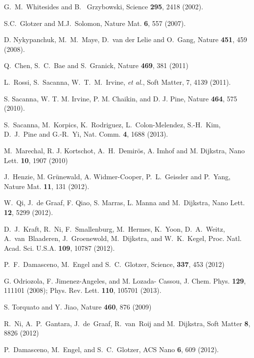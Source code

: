 \documentclass[8.5pt,oneside,onecolumn]{article}
\begin{document}
\footnotesize{
\begin{thebibliography}{99}

G.~M.~Whitesides and B.~ Grzybowski, Science {\bf295}, 2418 (2002).

S.C.~Glotzer and M.J.~Solomon, Nature Mat. {\bf 6}, 557 (2007).

D. Nykypanchuk, M.~M.~Maye, D.~van der Lelie and O.~Gang, Nature {\bf 451}, 459 (2008).

Q.~Chen, S.~C.~Bae and S.~Granick, Nature {\bf469}, 381 (2011)

L.~Rossi, S.~Sacanna, W.~T.~M.~Irvine, \emph{et al.}, Soft Matter, 7, 4139 (2011).

S. Sacanna, W. T. M. Irvine, P. M. Chaikin, and D. J.
Pine, Nature {\bf 464}, 575 (2010).

S.~Sacanna, M.~Korpics, K.~Rodriguez, L.~Colon-Melendez, S.-H.~Kim, D.~J.~Pine and G.-R.~Yi, Nat. Comm. {\bf 4}, 1688 (2013).

M.~Marechal, R. J. Kortschot, A.~H.~Demir\"os, A. Imhof and M. Dijkstra, Nano Lett. {\bf 10}, 1907 (2010)

J.~Henzie, M. Gr\"unewald, A. Widmer-Cooper, P.~L.~Geissler and P.~Yang, Nature Mat. {\bf 11}, 131 (2012).

W.~Qi, J.~de Graaf, F. Qiao, S. Marras, L. Manna and M.~Dijkstra, Nano Lett. {\bf 12}, 5299 (2012).

D.~J.~Kraft, R.~Ni, F.~Smallenburg, M.~Hermes, K.~Yoon, D.~A.~Weitz, A.~van~Blaaderen, J.~Groenewold, M.~Dijkstra, and W.~K.~Kegel,  Proc. Natl. Acad. Sci. U.S.A. {\bf 109}, 10787 (2012).

P.~F.~Damasceno, M.~Engel and S.~C.~Glotzer, Science, {\bf 337}, 453 (2012)

G. Odriozola, F. Jimenez-Angeles, and M. Lozada-
Cassou, J. Chem. Phys. {\bf 129}, 111101 (2008); Phys. Rev. Lett. {\bf 110}, 105701 (2013).

S. Torquato and Y. Jiao, Nature {\bf460}, 876 (2009)

R.~Ni, A.~P.~Gantara, J.~de~Graaf, R.~van~Roij and M.~Dijkstra, Soft Matter {\bf 8}, 8826 (2012)

P.~Damasceno, M.~Engel, and S.~C.~Glotzer, ACS Nano {\bf 6}, 609 (2012). 


\end{thebibliography}}
\end{document}
